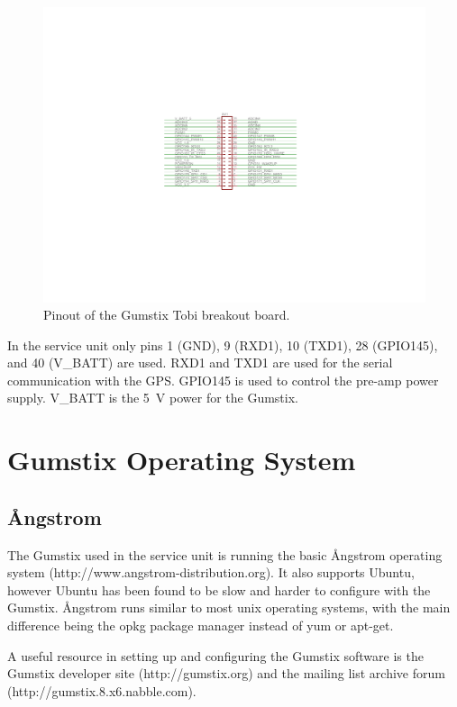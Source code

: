 \begin{figure}[ht!]
   \centering
   \includegraphics[scale=1]{Appendix/Figures/tobi_pinout.pdf} 
   \caption{Pinout of the Gumstix Tobi breakout board.}
   \label{app:gumstix:fig:tobi}
\end{figure}

In the service unit only pins 1 (GND), 9 (RXD1), 10 (TXD1), 28 (GPIO145), and 40 (V\_BATT) are used.
RXD1 and TXD1 are used for the serial communication with the GPS.
GPIO145 is used to control the pre-amp power supply.
V\_BATT is the 5~V power for the Gumstix.

\section{Gumstix Operating System}

\subsection{\r{A}ngstrom}

The Gumstix used in the service unit is running the basic \r{A}ngstrom operating system (http://www.angstrom-distribution.org).
It also supports Ubuntu, however Ubuntu has been found to be slow and harder to configure with the Gumstix.
\r{A}ngstrom runs similar to most unix operating systems, with the main difference being the opkg package manager instead of yum or apt-get.

A useful resource in setting up and configuring the Gumstix software is the Gumstix developer site (http://gumstix.org) and the mailing list archive forum (http://gumstix.8.x6.nabble.com).

